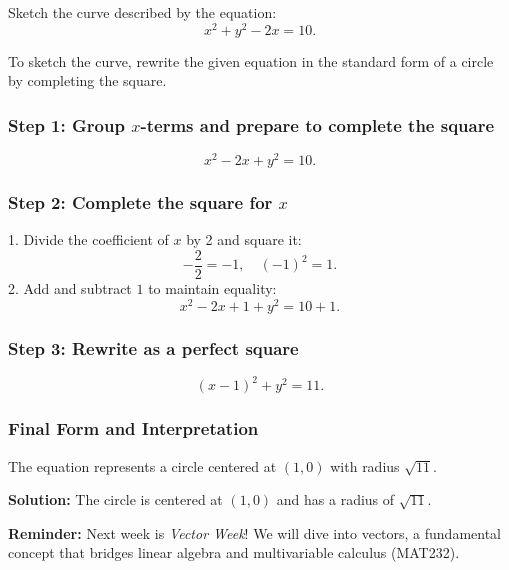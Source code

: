 \documentclass{article}
\begin{document}
\begin{examplebox}
    Sketch the curve described by the equation:
    \[
        x^2 + y^2 - 2x = 10.
    \]
    
    \begin{solutionbox}
    To sketch the curve, rewrite the given equation in the standard form of a circle by completing the square.
    
    \subsubsection*{Step 1: Group \(x\)-terms and prepare to complete the square}
    \[
        x^2 - 2x + y^2 = 10.
    \]
    
    \subsubsection*{Step 2: Complete the square for \(x\)}
    1. Divide the coefficient of \(x\) by 2 and square it:
       \[
           -\frac{2}{2} = -1, \quad (-1)^2 = 1.
       \]
    2. Add and subtract \(1\) to maintain equality:
       \[
           x^2 - 2x + 1 + y^2 = 10 + 1.
       \]
    
    \subsubsection*{Step 3: Rewrite as a perfect square}
    \[
        (x - 1)^2 + y^2 = 11.
    \]
    
    \subsubsection*{Final Form and Interpretation}
    The equation represents a circle centered at \((1, 0)\) with radius \(\sqrt{11}\).
    
    \begin{answerbox}
    \textbf{Solution:} The circle is centered at \((1, 0)\) and has a radius of \(\sqrt{11}\).
    \end{answerbox}
    
    \end{solutionbox}
\end{examplebox}
    
\begin{notebox}
    \textbf{Reminder:} Next week is \emph{Vector Week}! We will dive into vectors, a fundamental concept that bridges linear algebra and multivariable calculus (MAT232).
\end{notebox}    
\end{document}
